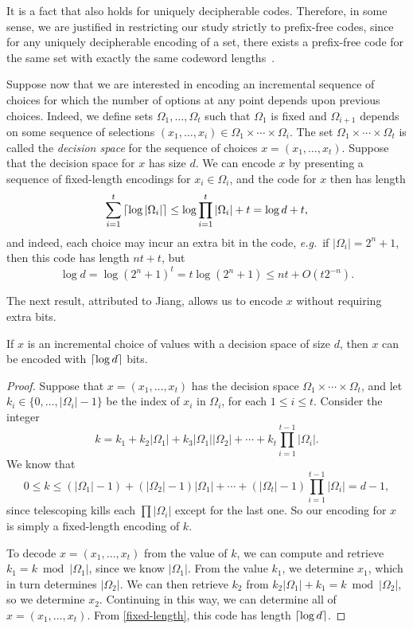 It is a fact that  also holds for uniquely
decipherable codes. Therefore, in some sense, we are justified in
restricting our study strictly to prefix-free codes, since for any
uniquely decipherable encoding of a set, there exists a prefix-free
code for the same set with exactly the same codeword
lengths~\cite{gallager:informationtheory,
  mcmillan:uniquedecipherability}.

Suppose now that we are interested in encoding an incremental sequence
of choices for which the number of options at any point depends upon
previous choices. Indeed, we define sets $\Omega_1, \ldots, \Omega_t$
such that $\Omega_1$ is fixed and $\Omega_{i + 1}$ depends on some
sequence of selections $(x_1, \ldots, x_i) \in \Omega_1 \times \cdots
\times \Omega_i$. The set $\Omega_1 \times \cdots \times \Omega_t$ is
called the \emph{decision space} for the sequence of choices $x =
(x_1, \ldots, x_t)$. Suppose that the decision space for $x$ has size
$d$. We can encode $x$ by presenting a sequence of fixed-length
encodings for $x_i \in \Omega_i$, and the code for $x$ then has length
\[
\sum_{i = 1}^t {\lceil \log |\Omega_i| \rceil} \leq \log \prod_{i=1}^t
|\Omega_i| + t = \log d + t,
\]
and indeed, each choice may incur an extra bit in the code,
\emph{e.g.}~if $|\Omega_i| = 2^{n} + 1$, then this code has length $nt + t$, but
\[
\log d = \log (2^n + 1)^t = t \log (2^n + 1) \leq nt + O(t 2^{-n}).
\]

The next result, attributed to Jiang, allows us to encode $x$ without
requiring extra bits.
\begin{lem}
  If $x$ is an incremental choice of values with a decision space of
  size $d$, then $x$ can be encoded with ${\lceil \log d \rceil}$ bits.
\end{lem}
\begin{proof}
  Suppose that $x = (x_1, \ldots, x_t)$ has the decision space
  $\Omega_1 \times \cdots \times \Omega_t$, and let
  $k_i \in \{0, \ldots, |\Omega_i| - 1\}$ be the index of $x_i$ in
  $\Omega_i$, for each $1 \leq i \leq t$. Consider the integer
  \[k = k_1 + k_2 |\Omega_1| + k_3 |\Omega_1| |\Omega_2| + \cdots +
  k_t \prod_{i=1}^{t-1}|\Omega_i|.\] We know that
  \[0 \leq k \leq (|\Omega_1| - 1) + (|\Omega_2| - 1)|\Omega_1| +
  \cdots + (|\Omega_t| - 1)\prod_{i = 1}^{t - 1} |\Omega_i| = d - 1,\]
  since telescoping kills each $\prod |\Omega_i|$ except for the last
  one. So our encoding for $x$ is simply a fixed-length encoding of
  $k$.

  To decode $x = (x_1, \ldots, x_t)$ from the value of $k$, we can
  compute and retrieve $k_1 = k \bmod |\Omega_1|$, since we know
  $|\Omega_1|$. From the value $k_1$, we determine $x_1$, which in
  turn determines $|\Omega_2|$. We can then retrieve $k_2$ from
  $k_2 |\Omega_1| + k_1 = k \bmod |\Omega_2|$, so we determine
  $x_2$. Continuing in this way, we can determine all of
  $x = (x_1, \ldots, x_t)$. From \eqref{fixed-length}, this code has
  length ${\lceil \log d \rceil}$.
\end{proof}

